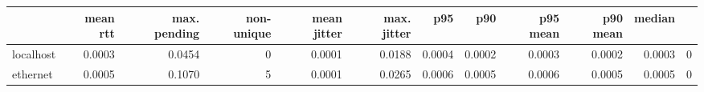 \begin{tabular}{l|rrrrrrrrrr}
 & mean rtt & max. pending & non-unique & mean jitter & max. jitter & p95 & p90 & p95 mean & p90 mean & median\\\hline
localhost & 0.0003 & 0.0454 & 0 & 0.0001 & 0.0188 & 0.0004 & 0.0002 & 0.0003 & 0.0002 & 0.0003 & 0 \\
ethernet & 0.0005 & 0.1070 & 5 & 0.0001 & 0.0265 & 0.0006 & 0.0005 & 0.0006 & 0.0005 & 0.0005 & 0 \\
\end{tabular}
